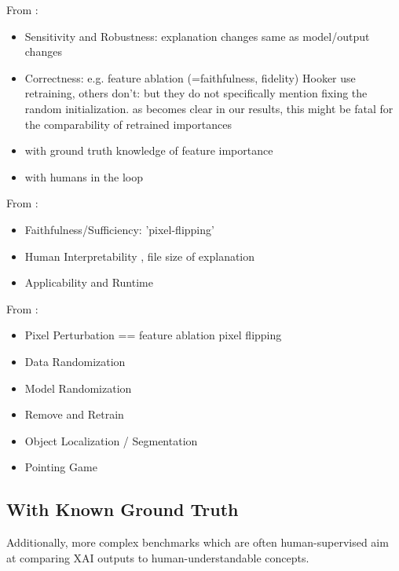 From \cite{Yang2019}:
\begin{itemize}
    \item Sensitivity and Robustness: explanation changes same as model/output changes \cite{Adebayo2018,Ghorbani2019a}
    \item Correctness: e.g. feature ablation (=faithfulness, fidelity) \cite{Samek2017a,Fong2017,Hooker2019} Hooker use retraining, others don't: but they do not specifically mention fixing the random initialization. as becomes clear in our results, this might be fatal for the comparability of retrained importances
    \item with ground truth knowledge of feature importance \cite{Kim2018, Yang2019, Clark2023,Arras2022,Bau2017,Parafita2019,Singla2022}
    \item with humans in the loop \cite{Singla2022, Ribeiro2016, Rong2023,Kim2018}
\end{itemize}

From \cite{Samek2021}:
\begin{itemize}
    \item Faithfulness/Sufficiency: 'pixel-flipping' \cite{Samek2017}
    \item Human Interpretability \cite{Kim2018}, file size of explanation
    \item Applicability and Runtime
\end{itemize}

From \cite{Arras2022}:
\begin{itemize}
    \item Pixel Perturbation == feature ablation pixel flipping \cite{Samek2017a, Samek2021, Bach2015, Lundberg2017}
    \item Data Randomization \cite{Adebayo2018}
    \item Model Randomization \cite{Adebayo2018,Sixt2020}
    \item Remove and Retrain \cite{Hooker2019}
    \item Object Localization / Segmentation \cite{Simonyan2014}
    \item Pointing Game
\end{itemize}


\subsection{With Known Ground Truth}
Additionally, more complex benchmarks \cite{Kim2018, Arras2022, Bau2017, Singla2022} which are often human-supervised aim at comparing XAI outputs to human-understandable concepts.

